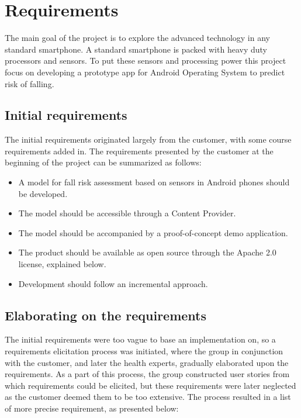 \chapter{Requirements}

The main goal of the project is to explore the advanced technology in any standard smartphone. A standard smartphone is packed with heavy duty processors and sensors. To put these sensors and processing power this project focus on developing a prototype app for Android Operating System to predict risk of falling. 

\section{Initial requirements}
The initial requirements originated largely from the customer, with some course requirements added in. The requirements presented by the customer at the beginning of the project can be summarized as follows:

\begin{itemize}
\item A model for fall risk assessment based on sensors in Android phones should be developed.
\item The model should be accessible through a Content Provider.
\item The model should be accompanied by a proof-of-concept demo application.
\item The product should be available as open source through the Apache 2.0 license, explained below.
\item Development should follow an incremental approach.
\end{itemize}

\section{Elaborating on the requirements}
\label{elaboratingrequirements}
The initial requirements were too vague to base an implementation on, so a requirements elicitation process was initiated, where the group in conjunction with the customer, and later the health experts, gradually elaborated upon the requirements. As a part of this process, the group constructed user stories from which requirements could be elicited, but these requirements were later neglected as the customer deemed them to be too extensive. The process resulted in a list of more precise requirement, as presented below:

